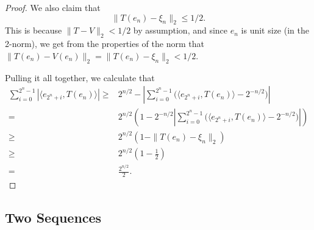 \documentclass[12pt]{article}
\begin{document}
\begin{proof}
	We also claim that 
	\begin{equation*}
		\|T(e_n)-\xi_n\|_2\leq 1/2.
	\end{equation*}
	This is because $\|T-V\|_2<1/2$ by assumption, and since $e_n$ is unit size (in the 2-norm), we get from the properties of the norm that $\|T(e_n) - V(e_n)\|_2=\|T(e_n)-\xi_n\|_2<1/2$. 

	Pulling it all together, we calculate that 
	\begin{align*}
		\sum_{i=0}^{2^n-1}|\langle e_{2^n+i}, T(e_n)\rangle|
		\geq& 2^{n/2} - \left| \sum_{i=0}^{2^n-1} \big( \langle e_{2^n+i},T(e_n)\rangle - 2^{-n/2} \big) \right| \\
		=& 2^{n/2}\left( 1 - 2^{-n/2} \left| \sum_{i=0}^{2^n-1} \big( \langle e_{2^n+i},T(e_n)\rangle - 2^{-n/2} \big) \right| \right) \\
		\geq& 2^{n/2}(1-\|T(e_n)-\xi_n\|_2) \\
		\geq& 2^{n/2}\left(1-\frac{1}{2}\right) \\
		=& \frac{2^{n/2}}{2}.
	\end{align*}
\end{proof}



\subsection{Two Sequences} %
\end{document}
